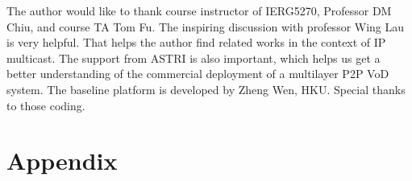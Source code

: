 \documentclass[11pt,a4paper]{article}
\begin{document}
The author would like to thank course instructor of IERG5270, Professor
DM Chiu, and course TA Tom Fu. The inspiring discussion with professor 
Wing Lau is very helpful. That helps the author find related works 
in the context of IP multicast. The support from ASTRI\cite{astri} is also important, 
which helps us get a better understanding of the commercial deployment
of a multilayer P2P VoD system. The baseline platform is developed 
by Zheng Wen, HKU. Special thanks to those coding. 


\pagebreak
\section*{Appendix}


\pagebreak
{}

\end{document}
